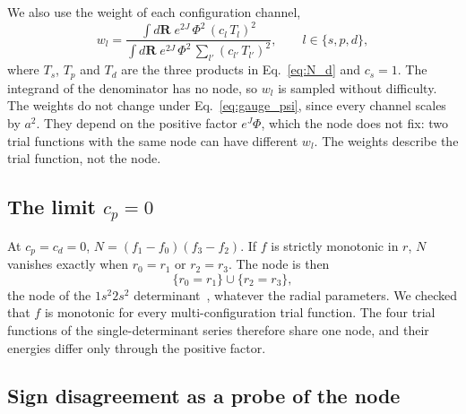 \documentclass[aps,prb,reprint,amsmath,amssymb,superscriptaddress,nofootinbib]{revtex4-2}
\begin{document}
We also use the weight of each configuration channel,
\begin{equation}
    w_l = \frac{\int \! d\mathbf{R}\; e^{2J}\, \Phi^2\, (c_l\, T_l)^2}
               {\int \! d\mathbf{R}\; e^{2J}\, \Phi^2\, \sum_{l'} (c_{l'}\, T_{l'})^2} ,
    \qquad l \in \{s, p, d\} ,
    \label{eq:weights}
\end{equation}
where $T_s$, $T_p$ and $T_d$ are the three products in Eq.~\eqref{eq:N_d} and
$c_s = 1$. The integrand of the denominator has no node, so $w_l$ is sampled
without difficulty. The weights do not change under
Eq.~\eqref{eq:gauge_psi}, since every channel scales by $a^2$. They depend on
the positive factor $e^{J}\Phi$, which the node does not fix: two trial
functions with the same node can have different $w_l$. The weights describe
the trial function, not the node.

\subsection{The limit $c_p = 0$}
\label{ssec:hf_limit}

At $c_p = c_d = 0$, $N = (f_1 - f_0)(f_3 - f_2)$. If $f$ is strictly monotonic
in $r$, $N$ vanishes exactly when $r_0 = r_1$ or $r_2 = r_3$. The node is then
\begin{equation}
    \{ r_0 = r_1 \} \cup \{ r_2 = r_3 \} ,
    \label{eq:hf_node}
\end{equation}
the node of the $1s^2 2s^2$ determinant~\cite{bressanini_nodes}, whatever the
radial parameters. We checked that $f$ is monotonic for every
multi-configuration trial function.
The four trial functions of the single-determinant series therefore share one
node, and their energies differ only through the positive factor.

\subsection{Sign disagreement as a probe of the node}
\label{ssec:sign_probe}
\end{document}
